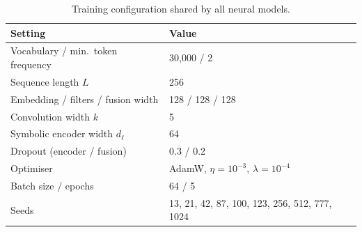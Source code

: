 \begin{table}[h]
\centering\small
\caption{Training configuration shared by all neural models.}
\begin{tabular}{ll}
\toprule
Setting & Value \\
\midrule
Vocabulary / min.\ token frequency & 30{,}000 / 2 \\
Sequence length $L$ & 256 \\
Embedding / filters / fusion width & 128 / 128 / 128 \\
Convolution width $k$ & 5 \\
Symbolic encoder width $d_\ell$ & 64 \\
Dropout (encoder / fusion) & 0.3 / 0.2 \\
Optimiser & AdamW, $\eta=10^{-3}$, $\lambda=10^{-4}$ \\
Batch size / epochs & 64 / 5 \\
Seeds & 13, 21, 42, 87, 100, 123, 256, 512, 777, 1024 \\
\bottomrule
\end{tabular}
\end{table}
